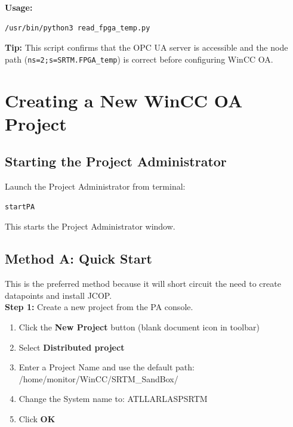 \documentclass[11pt,a4paper]{article}
\begin{document}
\textbf{Usage:}
\begin{lstlisting}
/usr/bin/python3 read_fpga_temp.py
\end{lstlisting}

\begin{tipbox}
\textbf{Tip:} This script confirms that the OPC UA server is accessible and the node path (\texttt{ns=2;s=SRTM.FPGA\_temp}) is correct before configuring WinCC OA.
\end{tipbox}

\newpage

\section{Creating a New WinCC OA Project}

\subsection{Starting the Project Administrator}

Launch the Project Administrator from terminal:
\begin{lstlisting}
startPA
\end{lstlisting}
This starts the Project Administrator window.

\subsection{Method A: Quick Start}

This is the preferred method because it will short circuit the need to create datapoints and install JCOP.\\

\noindent\textbf{Step 1:} Create a new project from the PA console.
\begin{enumerate}
    \item Click the \textbf{New Project} button (blank document icon in toolbar)
    \item Select \textbf{Distributed project}
    \item Enter a Project Name and use the default path: /home/monitor/WinCC/SRTM\_SandBox/
    \item Change the System name to: ATLLARLASPSRTM
    \item Click \textbf{OK} 
\end{enumerate}
\end{document}
